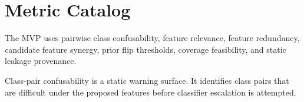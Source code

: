 \section{Metric Catalog}

The MVP uses pairwise class confusability, feature relevance, feature redundancy, candidate feature synergy, prior flip thresholds, coverage feasibility, and static leakage provenance.

Class-pair confusability is a static warning surface. It identifies class pairs that are difficult under the proposed features before classifier escalation is attempted.

